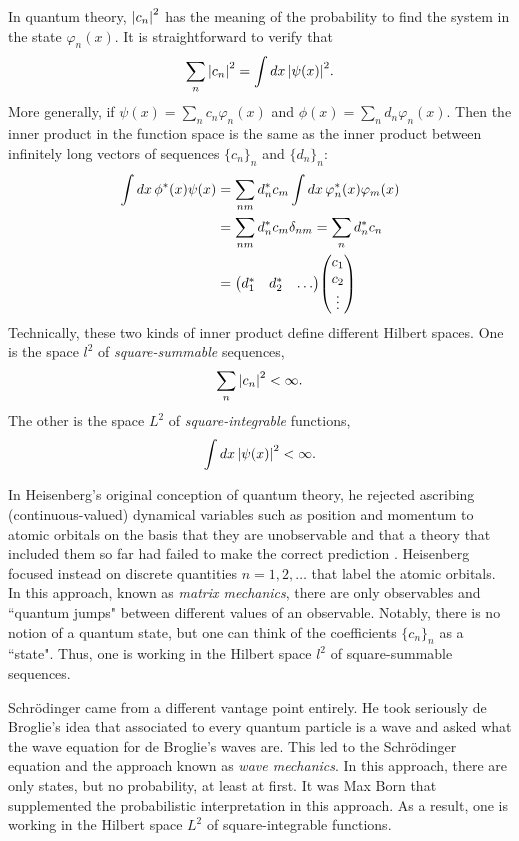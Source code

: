 In quantum theory, $\abs{c_n}^2$ has the meaning of the probability to find the system in the state $\varphi_n(x)$. It is straightforward to verify that
\begin{align}
	\sum_n \abs{c_n}^2 = \int dx\, \abs{\psi(x)}^2.
\end{align}
More generally, if $\psi(x) = \sum_n c_n \varphi_n(x)$ and $\phi(x) = \sum_n d_n \varphi_n(x)$. Then the inner product in the function space is the same as the inner product between infinitely long vectors of sequences $\{c_n\}_n$ and $\{d_n\}_n$:
\begin{align}
	\int dx\, \phi^*(x)\psi(x) &= \sum_{nm} d_n^* c_m \int dx\, \varphi_n^*(x) \varphi_m(x) \\
	&= \sum_{nm} d_n^* c_m \delta_{nm} = \sum_n d_n^* c_n \\
	&= \mqty(d_1^*&d_2^*&\dots)\mqty(c_1\\c_2\\ \vdots)
\end{align}
Technically, these two kinds of inner product define different Hilbert spaces. One is the space $l^2$ of \emph{square-summable} sequences, 
\begin{align}
	\sum_n \abs{c_n}^2 < \infty.
\end{align}
The other is the space $L^2$ of \emph{square-integrable} functions, 
\begin{align}
	\int dx\, \abs{\psi(x)}^2 < \infty.
\end{align}

In Heisenberg's original conception of quantum theory, he rejected ascribing (continuous-valued) dynamical variables such as position and momentum to atomic orbitals on the basis that they are unobservable and that a theory that included them so far had failed to make the correct prediction \cite{jammer}. 
Heisenberg focused instead on discrete quantities $n=1,2,\dots$ that label the atomic orbitals.
In this approach, known as \emph{matrix mechanics}, there are only observables and ``quantum jumps" between different values of an observable. 
Notably, there is no notion of a quantum state, but one can think of the coefficients $\{c_n\}_n$ as a ``state". Thus, one is working in the Hilbert space $l^2$ of square-summable sequences.

Schr\"odinger came from a different vantage point entirely. He took seriously de Broglie's idea that associated to every quantum particle is a wave and asked what the wave equation for de Broglie's waves are. This led to the Schr\"odinger equation and the approach known as \emph{wave mechanics}. 
In this approach, there are only states, but no probability, at least at first. 
It was Max Born that supplemented the probabilistic interpretation in this approach. As a result, one is working in the Hilbert space $L^2$ of square-integrable functions.

